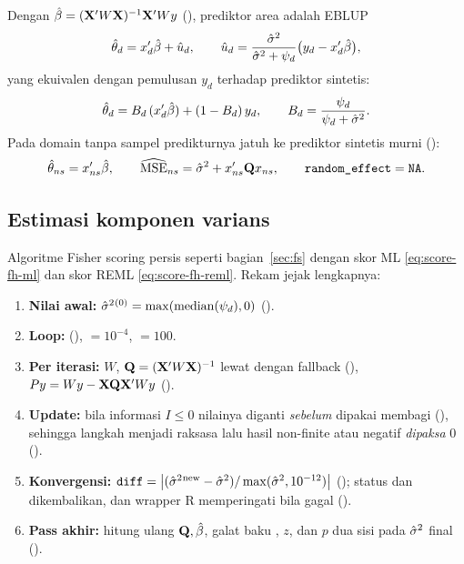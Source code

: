 Dengan $\hat\beta=(\mathbf{X}'W\mathbf{X})^{-1}\mathbf{X}'Wy$ (),
prediktor area adalah EBLUP
\begin{equation}
  \hat\theta_d=x_d'\hat\beta+\hat u_d,\qquad
  \hat u_d=\frac{\hat\sigma^2}{\hat\sigma^2+\psi_d}\bigl(y_d-x_d'\hat\beta\bigr),
  \label{eq:fh-pred}
\end{equation}
yang ekuivalen dengan pemulusan $y_d$ terhadap prediktor sintetis:
\begin{equation}
  \hat\theta_d=B_d\,(x_d'\hat\beta)+(1-B_d)\,y_d,
  \qquad B_d=\frac{\psi_d}{\psi_d+\hat\sigma^2}.
  \label{eq:fh-shrink}
\end{equation}
Pada domain tanpa sampel predikturnya jatuh ke prediktor sintetis murni
():
\begin{equation}
  \hat\theta_{ns}=x_{ns}'\hat\beta,\qquad
  \widehat{\mathrm{MSE}}_{ns}=\hat\sigma^2+x_{ns}'\mathbf{Q} x_{ns},\qquad
  \texttt{random\_effect}=\texttt{NA}.
  \label{eq:fh-unsampled}
\end{equation}

\subsection{Estimasi komponen varians}\label{sec:fh-varians}

Algoritme Fisher scoring persis seperti bagian~\ref{sec:fs} dengan skor ML
\eqref{eq:score-fh-ml} dan skor REML \eqref{eq:score-fh-reml}. Rekam jejak
lengkapnya:

\begin{enumerate}[label=\arabic*.]
  \item \textbf{Nilai awal:} ${\hat\sigma^2}{}^{(0)}=\max(\mathrm{median}(\psi_d),0)$
        ().
  \item \textbf{Loop:} 
        (),  $=10^{-4}$,  $=100$.
  \item \textbf{Per iterasi:} $W$, $\mathbf{Q}=(\mathbf{X}'W\mathbf{X})^{-1}$ lewat
         dengan fallback  (),
        $Py=Wy-\mathbf{X}\mathbf{Q}\mathbf{X}'Wy$ ().
  \item \textbf{Update:} bila informasi $I\le0$ nilainya diganti
         \emph{sebelum} dipakai
        membagi (), sehingga langkah menjadi raksasa lalu
        hasil non-finite atau negatif \emph{dipaksa} $0$ ().
  \item \textbf{Konvergensi:} $\texttt{diff}=\left|({\hat\sigma^2}{}^{\text{new}}-\hat\sigma^2)/
        \max(\hat\sigma^2,10^{-12})\right|$ (); status
         dan  dikembalikan, dan wrapper R
        memperingati bila gagal ().
  \item \textbf{Pass akhir:} hitung ulang $\mathbf{Q},\hat\beta$, galat baku
        , $z$, dan $p$ dua sisi pada $\hat\sigma^2$ final
        ().
\end{enumerate}

